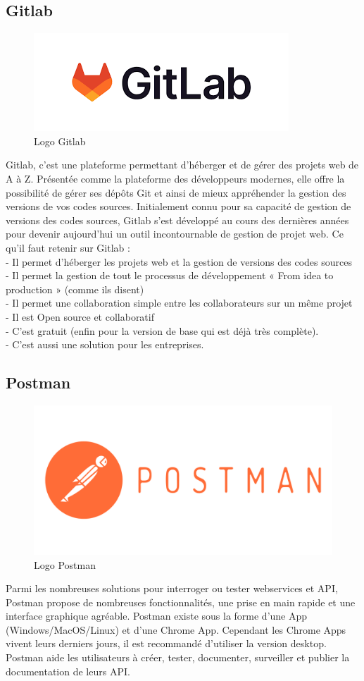 \documentclass[a4paper, 12pt]{report}
\begin{document}
\subsection{Gitlab}
\begin{figure}[H]
    \centering
    \includegraphics[width = 0.5\linewidth]{img/gitlab.png}
    \caption{Logo Gitlab}
\end{figure}
Gitlab, c’est une plateforme permettant d’héberger et de gérer des projets web de A à
Z. Présentée comme la plateforme des développeurs modernes, elle offre la possibilité de
gérer ses dépôts Git et ainsi de mieux appréhender la gestion des versions de vos codes
sources.
Initialement connu pour sa capacité de gestion de versions des codes sources, Gitlab
s’est développé au cours des dernières années pour devenir aujourd’hui un outil
incontournable de gestion de projet web.
Ce qu’il faut retenir sur Gitlab :\\
- Il permet d’héberger les projets web et la gestion de versions des codes
sources\\
- Il permet la gestion de tout le processus de développement « From idea to
production » (comme ils disent)\\
- Il permet une collaboration simple entre les collaborateurs sur un même projet\\
- Il est Open source et collaboratif\\
- C’est gratuit (enfin pour la version de base qui est déjà très complète).\\
- C’est aussi une solution pour les entreprises.\\ \cite{}
\subsection{Postman}
\begin{figure}[H]
    \centering
    \includegraphics[width = 0.5\linewidth]{img/postman.png}
    \caption{Logo Postman}
\end{figure}
Parmi les nombreuses solutions pour interroger ou tester webservices et API, Postman
propose de nombreuses fonctionnalités, une prise en main rapide et une interface graphique
agréable.
Postman existe sous la forme d’une App (Windows/MacOS/Linux) et d’une Chrome
App. Cependant les Chrome Apps vivent leurs derniers jours, il est recommandé d’utiliser la
version desktop.
Postman aide les utilisateurs à créer, tester, documenter, surveiller et publier la
documentation de leurs API.\cite{postman}
\end{document}
